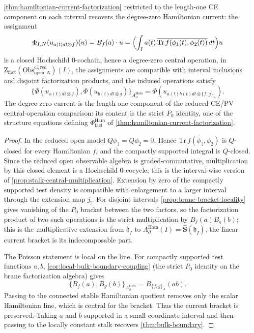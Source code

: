\documentclass[11pt]{memoir}
\begin{document}
\begin{thm}\label{thm:hamiltonian-current-center-lift}
  \ref{thm:hamiltonian-current-factorization} restricted to the
  length-one CE component on each interval recovers the degree-zero
  Hamiltonian current: the assignment
  $$\Phi_{I,N}(u_{a(t)dt\otimes f})(u)=B_f(a)\cdot u
    =\Bigl(\int_I a(t)\,
      \overline{\mathrm{Tr}\,f(\phi_1(t),\phi_2(t))}\,dt\Bigr)u$$
  is a closed Hochschild $0$-cochain, hence a degree-zero central
  operation, in $\mathrm Z_{\mathrm{fact}}
  (\mathrm{Obs}^{\mathrm{cl,red}}_{\mathrm{open},N})(I)$, the assignments
  are compatible with interval inclusions and disjoint factorization
  products, and the induced operations satisfy
  $$\{\Phi(u_{a(t)dt\otimes f}),\Phi(u_{b(t)dt\otimes g})\}_{A_\partial^{\mathrm{Ham}}}
    =\Phi(u_{a(t)b(t)dt\otimes\{f,g\}_{\bar A}}).$$
  The degree-zero current is the length-one component of the reduced
  CE/PV central-operation comparison: its content is the strict $P_0$
  identity, one of the structure equations defining
  $\Phi^{\mathrm{Ham}}_{\mathrm{fact}}$ of
  \ref{thm:hamiltonian-current-factorization}.
\end{thm}

\begin{proof}
  In the reduced open model $Q\phi_1=Q\phi_2=0$. Hence
  $\overline{\mathrm{Tr}\,f(\phi_1,\phi_2)}$ is $Q$-closed for every
  Hamiltonian $f$, and the compactly supported integral is $Q$-closed.
  Since the reduced open observable algebra is graded-commutative,
  multiplication by this closed element is a Hochschild $0$-cocycle;
  this is the interval-wise version of
  \ref{prop:stalk-central-multiplication}. Extension by zero of the
  compactly supported test density is compatible with enlargement to a larger interval
  through the extension map \(j_!\).
  For disjoint intervals \ref{prop:brane-bracket-locality} gives
  vanishing of the $P_0$ bracket between the two factors, so the
  factorization product of two such operations is the strict
  multiplication by $B_f(a)B_g(b)$; this is the
  multiplicative extension from $\mathfrak h_I$ to
  $A_\partial^{\mathrm{Ham}}(I)=\widehat{\mathbf S}(\mathfrak h_I)$;
  the linear current bracket is its indecomposable part.

  The Poisson statement is local on the line. For compactly supported
  test functions $a,b$,
  \ref{cor:local-bulk-boundary-coupling} (the strict $P_0$ identity
  on the brane factorization algebra) gives
  $$\{B_f(a),B_g(b)\}_{A_\partial^{\mathrm{Ham}}}
    =B_{\{f,g\}_{\bar A}}(ab).$$
  Passing to the connected stable Hamiltonian quotient removes only
  the scalar Hamiltonian line, which is central for the bracket. Thus
  the current bracket is preserved. Taking $a$ and $b$ supported in a
  small coordinate interval and then passing to the locally constant
  stalk recovers \ref{thm:bulk-boundary}.
\end{proof}
\end{document}

